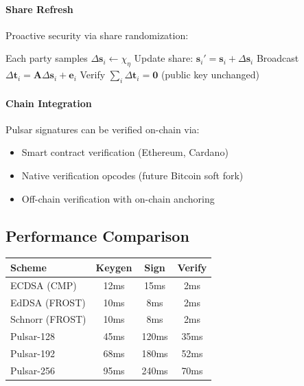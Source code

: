 \paragraph{Share Refresh} Proactive security via share randomization:
\begin{algorithmic}[1]
\State Each party samples $\Delta \mathbf{s}_i \leftarrow \chi_\eta$
\State Update share: $\mathbf{s}_i' = \mathbf{s}_i + \Delta \mathbf{s}_i$
\State Broadcast $\Delta \mathbf{t}_i = \mathbf{A} \Delta \mathbf{s}_i + \mathbf{e}_i$
\State Verify $\sum_i \Delta \mathbf{t}_i = \mathbf{0}$ (public key unchanged)

\end{algorithmic}

\paragraph{Chain Integration} Pulsar signatures can be verified on-chain via:
\begin{itemize}
\item Smart contract verification (Ethereum, Cardano)
\item Native verification opcodes (future Bitcoin soft fork)
\item Off-chain verification with on-chain anchoring
\end{itemize}

\subsection{Performance Comparison}

\begin{table}[h]
\centering
\small
\begin{tabular}{@{}lccc@{}}
\toprule
\textbf{Scheme} & \textbf{Keygen} & \textbf{Sign} & \textbf{Verify} \\
\midrule
ECDSA (CMP) & 12ms & 15ms & 2ms \\
EdDSA (FROST) & 10ms & 8ms & 2ms \\
Schnorr (FROST) & 10ms & 8ms & 2ms \\
Pulsar-128 & 45ms & 120ms & 35ms \\
Pulsar-192 & 68ms & 180ms & 52ms \\
Pulsar-256 & 95ms & 240ms & 70ms \\
\bottomrule
\end{tabular}

\label{tab:pq_performance}
\end{table}

